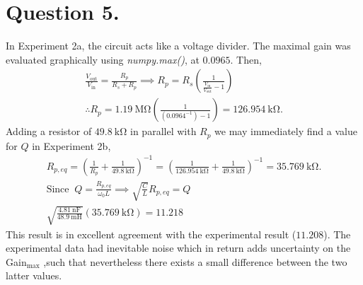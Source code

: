 \documentclass[
	12pt,
	]{article}
\theoremstyle{definition}
\theoremstyle{definition}
\theoremstyle{definition}
\theoremstyle{definition}
\theoremstyle{definition}
\theoremstyle{example}
\theoremstyle{note}
\theoremstyle{remark}
\theoremstyle{example}
\begin{document}
		\section*{Question 5.}
			In Experiment 2a, the circuit acts like a voltage divider. The maximal gain was evaluated graphically using \textit{numpy.max()}, at $0.0965$. Then,
			\begin{gather*}
				\frac{V_{\text{out}}}{V_{\text{in}}} = \frac{R_p}{R_s + R_p} \implies R_p = R_s \left(\frac{1}{\frac{V_{\text{in}}}{V_{\text{out}}} -1}\right) \\
				\therefore R_p = 1.19 \ \si{\mega\ohm} \left(\frac{1}{(0.0964^{-1}) -1}\right) = 126.954 \ \si{\kilo\ohm}.
			\end{gather*}
			Adding a resistor of $49.8 \ \si{\kilo\ohm}$ in parallel with $R_p$ we may immediately find a value for $Q$ in Experiment 2b,
			\begin{gather*}
				R_{p,eq}  = \left(\frac{1}{R_p} + \frac{1}{49.8 \ \si{\kilo\ohm}}\right)^{-1} = \left(\frac{1}{126. 954 \ \si{\kilo\ohm}} + \frac{1}{49.8 \ \si{\kilo\ohm}}\right)^{-1} = 35.769 \ \si{\kilo\ohm}.\\
				\text{Since } \ Q = \frac{R_{p,eq}}{\omega_{0}L} \implies \sqrt{\frac{C}{L}}R_{p,eq} = Q \\
				\sqrt{\frac{4.81 \ \si{\nano\farad}}{48.9 \ \si{\milli\henry}}}(35.769 \ \si{\kilo\ohm}) = 11.218
			\end{gather*}
			This result is in excellent agreement with the experimental result ($11.208$). The experimental data had inevitable noise which in return adds uncertainty on the Gain$_{\text{max}}$ ,such that nevertheless there exists a small difference between the two latter values.
\end{document}
